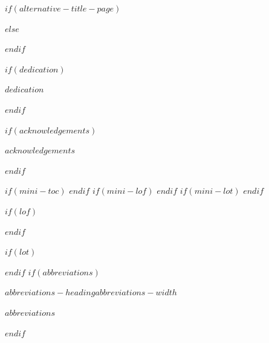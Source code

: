 \documentclass[a4paper, $if(page-layout)$$page-layout$$endif$]{templates/ociamthesis}
\begin{document}
\begin{romanpages}

$if(alternative-title-page)$

$else$
\maketitle
$endif$

$if(dedication)$
\begin{dedication}
  $dedication$
\end{dedication}
$endif$

$if(acknowledgements)$
\begin{acknowledgements}
 	$acknowledgements$
\end{acknowledgements}
$endif$


\begin{abstract}
	$abstract$
\end{abstract}

$if(mini-toc)$
  \dominitoc %
$endif$
$if(mini-lof)$
  \dominilof  %
$endif$
$if(mini-lot)$
  \dominilot  %
$endif$

\flushbottom

\tableofcontents

$if(lof)$
\listoffigures
	\mtcaddchapter
$endif$

$if(lot)$
\listoftables
  \mtcaddchapter
$endif$
$if(abbreviations)$
\begin{mclistof}{$abbreviations-heading$}{$abbreviations-width$}

$abbreviations$

\end{mclistof} 

$endif$

\end{romanpages}
\end{document}
